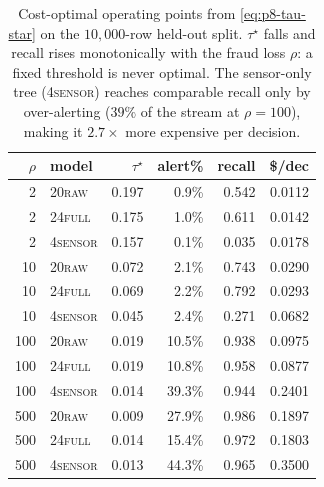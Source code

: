 \begin{table}[t]
\centering
\small
\caption{Cost-optimal operating points from \eqref{eq:p8-tau-star} on the
$10{,}000$-row held-out split. $\tau^\star$ falls and recall rises
monotonically with the fraud loss $\rho$: a fixed threshold is never
optimal. The sensor-only tree (\textsc{4sensor}) reaches comparable recall
only by over-alerting ($39\%$ of the stream at $\rho{=}100$), making it
$2.7\times$ more expensive per decision.}
\label{tab:p8-cost-optimal}
\begin{tabular}{r l r r r r}
\toprule
$\rho$ & model & $\tau^\star$ & alert\% & recall & \$/dec \\
\midrule
2   & \textsc{20raw}   & 0.197 & 0.9\%  & 0.542 & 0.0112 \\
2   & \textsc{24full}  & 0.175 & 1.0\%  & 0.611 & 0.0142 \\
2   & \textsc{4sensor} & 0.157 & 0.1\%  & 0.035 & 0.0178 \\
\midrule
10  & \textsc{20raw}   & 0.072 & 2.1\%  & 0.743 & 0.0290 \\
10  & \textsc{24full}  & 0.069 & 2.2\%  & 0.792 & 0.0293 \\
10  & \textsc{4sensor} & 0.045 & 2.4\%  & 0.271 & 0.0682 \\
\midrule
100 & \textsc{20raw}   & 0.019 & 10.5\% & 0.938 & 0.0975 \\
100 & \textsc{24full}  & 0.019 & 10.8\% & 0.958 & 0.0877 \\
100 & \textsc{4sensor} & 0.014 & 39.3\% & 0.944 & 0.2401 \\
\midrule
500 & \textsc{20raw}   & 0.009 & 27.9\% & 0.986 & 0.1897 \\
500 & \textsc{24full}  & 0.014 & 15.4\% & 0.972 & 0.1803 \\
500 & \textsc{4sensor} & 0.013 & 44.3\% & 0.965 & 0.3500 \\
\bottomrule
\end{tabular}
\end{table}

